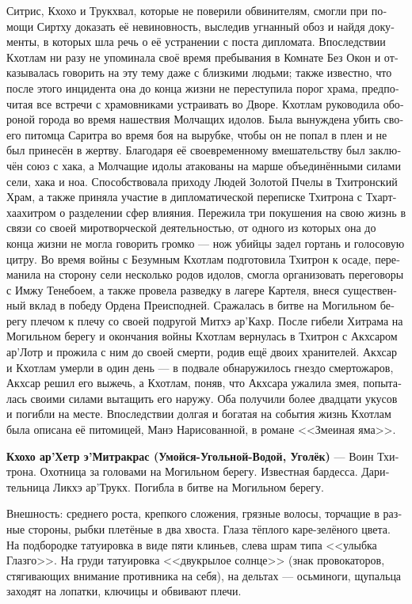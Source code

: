 \documentclass[a4paper,12pt,fleqn]{book}\usepackage{cooltooltips}\usepackage{polyglossia}\setdefaultlanguage[babelshorthands=true]{russian}\setotherlanguage{english}\defaultfontfeatures{Ligatures=TeX,Mapping=tex-text} \usepackage{xcolor}\definecolor{lightgray}{HTML}{bbbbbb}\color{lightgray}\newcommand{\ml}[3]{\textenglish{\textcolor{black}{#3}}}
\newcommand{\theterm}[3]{\textbf{\hypertarget{#1}{#2}} --- #3}
\begin{document}
{{Ситрис, Кхохо и Трукхвал, которые не поверили обвинителям, смогли при помощи Сиртху доказать её невиновность, выследив угнанный обоз и найдя документы, в которых шла речь о её устранении с поста дипломата.
Впоследствии Кхотлам ни разу не упоминала своё время пребывания в Комнате Без Окон и отказывалась говорить на эту тему даже с близкими людьми;
также известно, что после этого инцидента она до конца жизни не переступила порог храма, предпочитая все встречи с храмовниками устраивать во Дворе.
Кхотлам руководила обороной города во время нашествия Молчащих идолов.
Была вынуждена убить своего питомца Саритра во время боя на вырубке, чтобы он не попал в плен и не был принесён в жертву.
Благодаря её своевременному вмешательству был заключён союз с хака, а Молчащие идолы атакованы на марше объединёнными силами сели, хака и ноа.
Способствовала приходу Людей Золотой Пчелы в Тхитронский Храм, а также приняла участие в дипломатической переписке Тхитрона с Тхартхаахитром о разделении сфер влияния.
Пережила три покушения на свою жизнь в связи со своей миротворческой деятельностью, от одного из которых она до конца жизни не могла говорить громко --- нож убийцы задел гортань и голосовую цитру.
Во время войны с Безумным Кхотлам подготовила Тхитрон к осаде, переманила на сторону сели несколько родов идолов, смогла организовать переговоры с Имжу Тенебоем, а также провела разведку в лагере Картеля, внеся существенный вклад в победу Ордена Преисподней.
Сражалась в битве на Могильном берегу плечом к плечу со своей подругой Митхэ ар'Кахр.
После гибели Хитрама на Могильном берегу и окончания войны Кхотлам вернулась в Тхитрон с Акхсаром ар'Лотр и прожила с ним до своей смерти, родив ещё двоих хранителей.
Акхсар и Кхотлам умерли в один день --- в подвале обнаружилось гнездо смертожаров, Акхсар решил его выжечь, а Кхотлам, поняв, что Акхсара ужалила змея, попыталась своими силами вытащить его наружу.
Оба получили более двадцати укусов и погибли на месте.
Впоследствии долгая и богатая на события жизнь Кхотлам была описана её питомицей, Манэ Нарисованной, в романе <<Змеиная яма>>.}

\theterm{kchoho} %
{Кхохо ар'Хетр э'Митракрас (Умойся-Угольной-Водой, Уголёк)}
{Воин Тхитрона.
Охотница за головами на Могильном берегу.
Известная бардесса.
Дарительница Ликхэ ар'Трукх.
Погибла в битве на Могильном берегу.

Внешность: среднего роста, крепкого сложения, грязные волосы, торчащие в разные стороны, рыбки плетёные в два хвоста.
Глаза тёплого каре-зелёного цвета.
На подбородке татуировка в виде пяти клиньев, слева шрам типа <<улыбка Глазго>>.
На груди татуировка <<двукрылое солнце>> (знак провокаторов, стягивающих внимание противника на себя), на дельтах --- осьминоги, щупальца заходят на лопатки, ключицы и обвивают плечи.}

}
\end{document}
